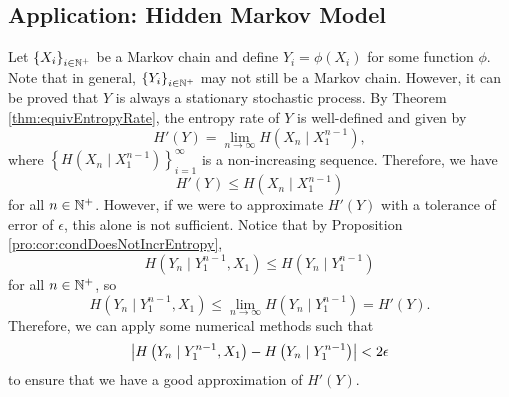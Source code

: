 \documentclass[math]{amznotes}
\theoremstyle{remark}
\begin{document}
\subsection{Application: Hidden Markov Model}
Let $\left\{X_i\right\}_{i \in \mathbb{N}^+}$ be a Markov chain and define $Y_i = \phi\left(X_i\right)$ for some function $\phi$. Note that in general, $\left\{Y_i\right\}_{i \in \mathbb{N}^+}$ may not still be a Markov chain. However, it can be proved that $Y$ is always a stationary stochastic process. By Theorem \ref{thm:equivEntropyRate}, the entropy rate of $Y$ is well-defined and given by 
\begin{equation*}
    H'\left(Y\right) = \lim_{n \to \infty}H\left(X_n \mid X_1^{n - 1}\right),
\end{equation*}
where $\left\{H\left(X_n \mid X_1^{n - 1}\right)\right\}_{i = 1}^{\infty}$ is a non-increasing sequence. Therefore, we have 
\begin{equation*}
    H'\left(Y\right) \leq H\left(X_n \mid X_1^{n - 1}\right)
\end{equation*}
for all $n \in \mathbb{N}^+$. However, if we were to approximate $H'\left(Y\right)$ with a tolerance of error of $\epsilon$, this alone is not sufficient. Notice that by Proposition \ref{pro:cor:condDoesNotIncrEntropy}, 
\begin{equation*}
    H\left(Y_n \mid Y_1^{n - 1}, X_1\right) \leq H\left(Y_n \mid Y_1^{n - 1}\right)
\end{equation*}
for all $n \in \mathbb{N}^+$, so 
\begin{equation*}
    H\left(Y_n \mid Y_1^{n - 1}, X_1\right) \leq \lim_{n \to \infty}H\left(Y_n \mid Y_1^{n - 1}\right) = H'\left(Y\right).
\end{equation*}
Therefore, we can apply some numerical methods such that 
\begin{equation*}
    {\left\lvert {H\left(Y_n \mid Y_1^{n - 1}, X_1\right) - H\left(Y_n \mid Y_1^{n - 1}\right)} \right\rvert} < 2\epsilon
\end{equation*}
to ensure that we have a good approximation of $H'\left(Y\right)$.
\end{document}
